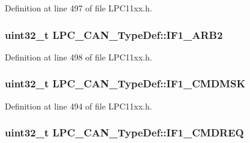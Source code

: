 Definition at line 497 of file L\+P\+C11xx.\+h.

\subsubsection[{\texorpdfstring{I\+F1\+\_\+\+A\+R\+B2}{IF1_ARB2}}]{ uint32\+\_\+t L\+P\+C\+\_\+\+C\+A\+N\+\_\+\+Type\+Def\+::\+I\+F1\+\_\+\+A\+R\+B2}\hypertarget{group___l_p_c11xx___definitions_gafb8cc57b47b3f40fb755b775734ae96c}{}\label{group___l_p_c11xx___definitions_gafb8cc57b47b3f40fb755b775734ae96c}


Definition at line 498 of file L\+P\+C11xx.\+h.

\subsubsection[{\texorpdfstring{I\+F1\+\_\+\+C\+M\+D\+M\+SK}{IF1_CMDMSK}}]{ uint32\+\_\+t L\+P\+C\+\_\+\+C\+A\+N\+\_\+\+Type\+Def\+::\+I\+F1\+\_\+\+C\+M\+D\+M\+SK}\hypertarget{group___l_p_c11xx___definitions_ga3b6c7f057c23660d4f7e07737ac841cf}{}\label{group___l_p_c11xx___definitions_ga3b6c7f057c23660d4f7e07737ac841cf}


Definition at line 494 of file L\+P\+C11xx.\+h.

\subsubsection[{\texorpdfstring{I\+F1\+\_\+\+C\+M\+D\+R\+EQ}{IF1_CMDREQ}}]{ uint32\+\_\+t L\+P\+C\+\_\+\+C\+A\+N\+\_\+\+Type\+Def\+::\+I\+F1\+\_\+\+C\+M\+D\+R\+EQ}\hypertarget{group___l_p_c11xx___definitions_ga45151797d18dbb4cdee027788d7dc2f6}{}\label{group___l_p_c11xx___definitions_ga45151797d18dbb4cdee027788d7dc2f6}


